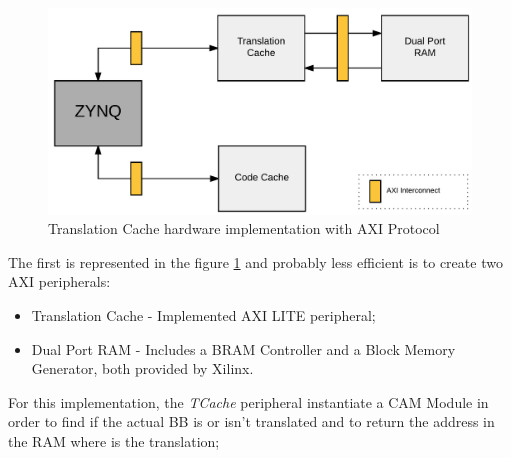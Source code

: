 \begin{figure} [H]
	\centering
	\includegraphics[scale = 0.2]{Images/DesignHw1.png}
	\caption{Translation Cache hardware implementation with AXI Protocol}
	\label{fig:TCache_Hw}
\end{figure}

The first is represented in the figure \ref{fig:TCache_Hw} and probably less efficient is to create two AXI peripherals:
\begin{itemize}
	\item Translation Cache - Implemented AXI LITE peripheral;
	\item Dual Port RAM - Includes a BRAM Controller and a Block Memory Generator, both provided by Xilinx.	
\end{itemize}

For this implementation, the \textit{TCache} peripheral instantiate a CAM Module in order to find if the actual BB is or isn't translated and to return the address in the RAM where is the translation;